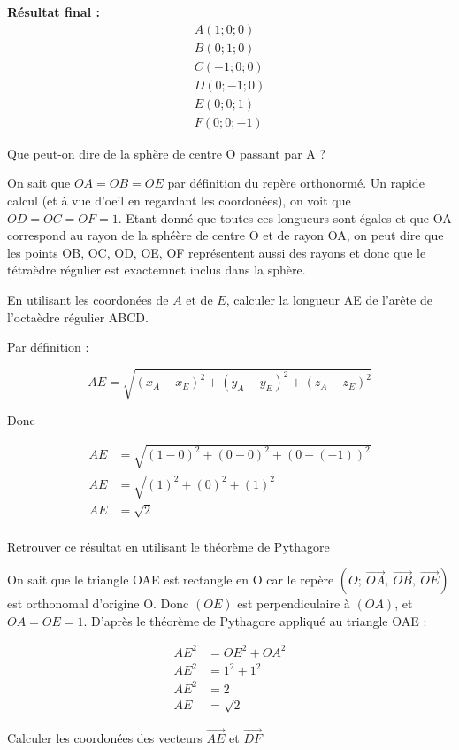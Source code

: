 \documentclass[answers]{exam}
\begin{document}
\begin{questions}
\begin{solution}
  \textbf{Résultat final :} 
\begin{align*}
  A(1; 0; 0) \\
  B(0; 1; 0) \\
  C(-1; 0; 0) \\
  D(0; -1; 0) \\
  E(0; 0; 1) \\
  F(0; 0; -1)
\end{align*} 
  \end{solution}
  \question[1] Que peut-on dire de la sphère de centre O passant par A ?
  \begin{solution}
    On sait que $OA = OB = OE$ par définition du repère orthonormé. Un rapide calcul (et à vue d'oeil en regardant les coordonées), on voit que $OD = OC = OF = 1$. Etant donné que toutes ces longueurs sont égales et que OA correspond au rayon de la sphéère de centre O et de rayon OA, on peut dire que les points OB, OC, OD, OE, OF représentent aussi des rayons et donc que le tétraèdre régulier est exactemnet inclus dans la sphère.
  \end{solution}
  \question[1] En utilisant les coordonées de $A$ et de $E$, calculer la longueur AE de l'arête de l'octaèdre régulier ABCD.
  \begin{solution}
    Par définition : 

  \[
  AE = \sqrt{(x_A - x_E)^2 + (y_A - y_E)^2 + (z_A - z_E)^2}
  \]

  Donc 

  \begin{align}
    AE &= \sqrt{(1-0)^2 + (0 - 0)^2 + (0 - (-1))^2} \\
    AE &= \sqrt{(1)^2 + (0)^2 + (1)^2} \\
    AE &= \sqrt{2} \\
  \end{align}
  \end{solution}
  \question[1] Retrouver ce résultat en utilisant le théorème de Pythagore
  \begin{solution}
    On sait que le triangle OAE est rectangle en O car le repère $\left(O\mathpunct{} ; \ \overrightarrow{OA}\mathpunct{}, \ \overrightarrow{OB}\mathpunct{}, \ \overrightarrow{OE}\right)$ est orthonomal d'origine O. 
    Donc $(OE)$ est perpendiculaire à $(OA)$, et $OA = OE = 1$. D'après le théorème de Pythagore appliqué au triangle OAE : 
  
    \begin{align}
    AE^2 &= OE^2 + OA^2 \\
    AE^2 &= 1^2 + 1^2 \\ 
    AE^2 &= 2 \\ 
    AE &= \sqrt{2}
  \end{align}
  \end{solution}
  \question[1] Calculer les coordonées des vecteurs $\overrightarrow{AE}$ et $\overrightarrow{DF}$
  \begin{solution}
  

\end{solution}
\end{questions}
\end{document}
